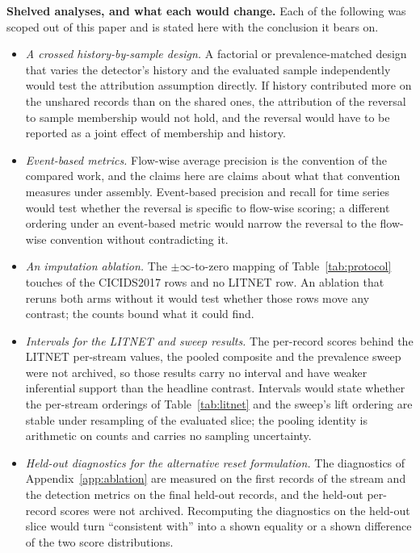 \documentclass[manuscript,screen,nonacm]{acmart}
\begin{document}
\textbf{Shelved analyses, and what each would change.} Each of the following
was scoped out of this paper and is stated here with the conclusion it bears
on.
\begin{itemize}
\item \emph{A crossed history-by-sample design.} A factorial or
prevalence-matched design that varies the detector's history and the evaluated
sample independently would test the attribution assumption directly. If
history contributed more on the unshared records than on the shared ones, the
attribution of the reversal to sample membership would not hold, and the
reversal would have to be reported as a joint effect of membership and
history.
\item \emph{Event-based metrics.} Flow-wise average precision is the
convention of the compared work, and the claims here are claims about what
that convention measures under assembly. Event-based precision and recall for
time series~\citep{tatbul2018precision} would test whether the reversal is
specific to flow-wise scoring; a different ordering under an event-based
metric would narrow the reversal to the flow-wise convention without
contradicting it.
\item \emph{An imputation ablation.} The $\pm\infty$-to-zero mapping of
Table~\ref{tab:protocol} touches \RefImputeCicidsAffectedRows{} of the
\RefImputeCicidsRows{} CICIDS2017 rows and no LITNET row. An ablation that
reruns both arms without it would test whether those rows move any contrast;
the counts bound what it could find.
\item \emph{Intervals for the LITNET and sweep results.} The per-record
scores behind the LITNET per-stream values, the pooled composite and the
prevalence sweep were not archived, so those results carry no interval and
have weaker inferential support than the headline contrast. Intervals would
state whether the per-stream orderings of Table~\ref{tab:litnet} and the
sweep's lift ordering are stable under resampling of the evaluated slice; the
pooling identity is arithmetic on counts and carries no sampling
uncertainty.
\item \emph{Held-out diagnostics for the alternative reset formulation.}
The diagnostics of Appendix~\ref{app:ablation} are measured on the first
\SSixDiagWindowRows{} records of the stream and the detection metrics on the
final \SSixTestRows{} held-out records, and the held-out per-record scores were
not archived. Recomputing the diagnostics on the held-out slice would turn
``consistent with'' into a shown equality or a shown difference of the two
score distributions.
\end{itemize}
\end{document}
